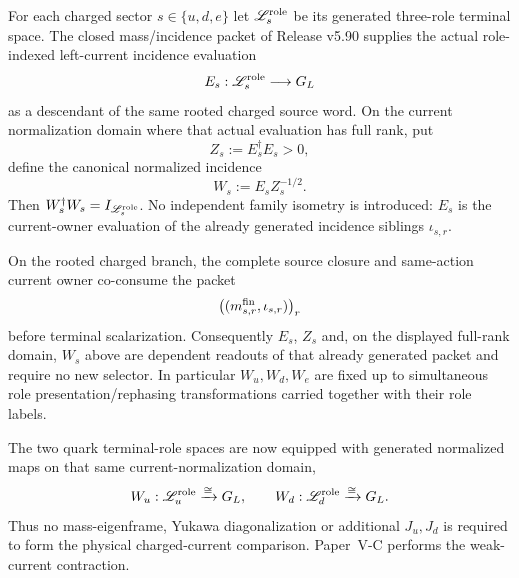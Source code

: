 \documentclass[12pt,a4paper]{article}
\begin{document}
\begin{definition}
\label{p6:def:v594-charged-role-incidence-evaluation}
For each charged sector $s\in\{u,d,e\}$ let
$\mathscr L_s^{\rm role}$ be its generated three-role terminal space.  The
closed mass/incidence packet of Release v5.90 supplies the actual role-indexed
left-current incidence evaluation
\[
 E_s:\mathscr L_s^{\rm role}\longrightarrow G_L
\]
as a descendant of the same rooted charged source word.  On the current
normalization domain where that actual evaluation has full rank, put
\[
 Z_s:=E_s^\dagger E_s>0,
\]
define the canonical normalized incidence
\[
 \boxed{W_s:=E_sZ_s^{-1/2}.}
\]
Then $W_s^\dagger W_s=I_{\mathscr L_s^{\rm role}}$.  No independent family
isometry is introduced: $E_s$ is the current-owner evaluation of the already
generated incidence siblings $\iota_{s,r}$.
\end{definition}

\begin{theorem}
\label{p6:thm:v594-charged-current-evaluations-generated}
On the rooted charged branch, the complete source closure and same-action
current owner co-consume the packet
\[
 \bigl((m_{s,r}^{\rm fin},\iota_{s,r})\bigr)_r
\]
before terminal scalarization.  Consequently $E_s$, $Z_s$ and, on the
displayed full-rank domain, $W_s$ above are
dependent readouts of that already generated packet and require no new
selector.  In particular $W_u,W_d,W_e$ are fixed up to simultaneous role
presentation/rephasing transformations carried together with their role
labels.
\end{theorem}

\begin{corollary}
\label{p6:cor:v594-quark-current-ready}
The two quark terminal-role spaces are now equipped with generated normalized
maps on that same current-normalization domain,
\[
 W_u:\mathscr L_u^{\rm role}\xrightarrow{\cong}G_L,
 \qquad
 W_d:\mathscr L_d^{\rm role}\xrightarrow{\cong}G_L.
\]
Thus no mass-eigenframe, Yukawa diagonalization or additional $J_u,J_d$ is
required to form the physical charged-current comparison.  Paper~V-C performs
the weak-current contraction.
\end{corollary}
\end{document}
